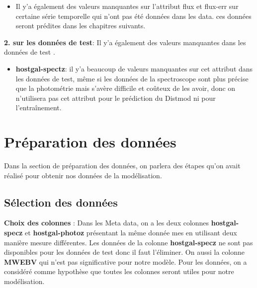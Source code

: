 \begin{itemize}
    \item Il y'a également des valeurs manquantes sur l'attribut flux et flux-err sur certaine série temporelle qui n'ont pas été données dans les data. ces données seront prédites dans les chapitres suivants.
\end{itemize}
\newline

\textbf{2. sur les données de test}: Il y'a également des valeurs manquantes dans les données de test .
\newline
\begin{itemize}
    \item \textbf{hostgal-spectz}: il y'a beaucoup de valeurs manquantes sur cet attribut dans les données de test, même si les données de la spectroscope sont plus précise que la photométrie mais s'avère difficile et coûteux de les avoir, donc on n'utilisera pas cet attribut pour le prédiction du Distmod ni pour l'entraînement.  
\end{itemize}




\section{Préparation des données}\label{sec:data_preparation}
Dans la section de préparation des données, on parlera des étapes qu’on avait réalisé pour obtenir nos données de la modélisation.
\subsection{Sélection des données}
\textbf{Choix des colonnes} : Dans les Meta data, on a les deux colonnes \textbf{hostgal-specz} et\textbf{ hostgal-photoz} présentant la même donnée mes en utilisant deux manière mesure différentes. Les données de la colonne \textbf{hostgal-specz} ne sont pas disponibles pour les données de test donc il faut l’éliminer. On aussi la colonne \textbf{MWEBV} qui n’est pas significative pour notre modèle. Pour les données, on a considéré comme hypothèse que toutes les colonnes seront utiles pour notre modélisation.

